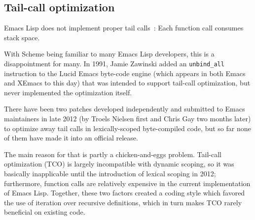 \documentclass[format=acmsmall, review]{acmart}
\newcommand \Elisp {Emacs Lisp}
\begin{document}
\subsection{Tail-call optimization}
\label{sec:tco}

\Elisp{} does not implement proper tail calls~\cite{Clinger1998}: Each
function call consumes stack space.

With Scheme being familiar to
many \Elisp{} developers, this is a disappointment for many.
In 1991, Jamie Zawinski added an \texttt{unbind\_all} instruction to
the Lucid Emacs byte-code engine (which appears in both Emacs and
XEmacs to this day) that was intended to support tail-call optimization,
but never implemented the optimization itself.

There have been two patches developed independently and submitted to Emacs
maintainers in late 2012 (by Troels Nielsen first and Chris Gay two months
later) to optimize away tail calls in lexically-scoped byte-compiled code,
but so far none of them have made it into an official release.

The main reason for that is partly a chicken-and-eggs problem.  Tail-call
optimization (TCO) is largely incompatible with dynamic scoping, so it was
basically inapplicable until the introduction of lexical scoping in 2012;
furthermore, function calls are relatively expensive in the current
implementation of \Elisp{}.  Together, these two factors created a coding
style which favored the use of iteration over recursive definitions, which
in turn makes TCO rarely beneficial on existing code.
\end{document}
